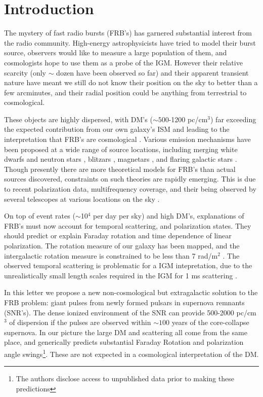 \documentclass[useAMS,usenatbib]{mn2e}
\begin{document}
\section{Introduction}
The mystery of fast radio bursts (FRB's) has garnered
substantial interest from the radio community.
High-energy astrophysicists have tried to model their burst source, 
observers would like to measure a large population of them, and cosmologists
hope to use them as a probe of the IGM. However their relative scarcity 
(only $\sim$ dozen have been observed so far) and their apparent 
transient nature have meant we still do not know their position on the sky
to better than a few arcminutes, and their radial position could be anything
from terrestrial to cosmological.

These objects are
highly dispersed, with DM's ($\sim 500$-1200 pc/cm$^3$) far exceeding
the expected contribution from our own galaxy's ISM and leading to the
interpretation that FRB's are cosmological \citep{2007Sci...318..777L, 2013Sci...341...53T}. 
Various emission mechanisms have been proposed 
at a wide range of source locations, 
including merging white dwarfs \citep{2012ApJ...760...64M}
and neutron stars \citep{2013PASJ...65L..12T},
blitzars \citep{2014A&A...562A.137F}, 
magnetars \citep{2015arXiv150101341P, 2014MNRAS.442L...9L}, 
and flaring galactic stars \citep{2004ApJ...615..253P}.
Though presently there are more theoretical models for FRB's than actual 
sources discovered, constraints on such theories are rapidly emerging. 
This is due to recent polarization data, 
multifrequency coverage, and their being observed by several telescopes
at various locations on the sky \citep{2014ApJ...780L...2B, 2014arXiv1412.0342P}. 

On top of event rates ($\sim$10$^4$ per day per sky) 
and high DM's, explanations of FRB's must now
account for temporal scattering, and polarization states.  They should
predict or explain Faraday rotation and time dependence of linear polarization.
The rotation measure of our galaxy has been mapped, and the
intergalactic rotation measure is constrained to be less than 7 rad/m$^2$
\citep{2015A&A...575A.118O}. 
The observed temporal scattering is problematic for a IGM intepretation, due 
to the unrealistically small length scales required in the IGM 
for 1 ms scattering \citep{2014ApJ...785L..26L}. 

In this letter we propose a new non-cosmological but extragalactic
solution to the FRB problem: giant pulses from newly formed pulsars in 
supernova remnants (SNR's). The dense ionized environment of the SNR
can provide 500-2000 pc/cm$^3$ of dispersion if the pulses are observed 
within $\sim100$ years of the core-collapse supernova. In our picture the 
large DM and scattering all come from the same place, and generically
predicts substantial Faraday Rotation and polarization angle
swings\footnote{The authors disclose access to unpublished data prior
  to making these predictions}.
These are not expected in a cosmological interpretation of the DM.
\end{document}
